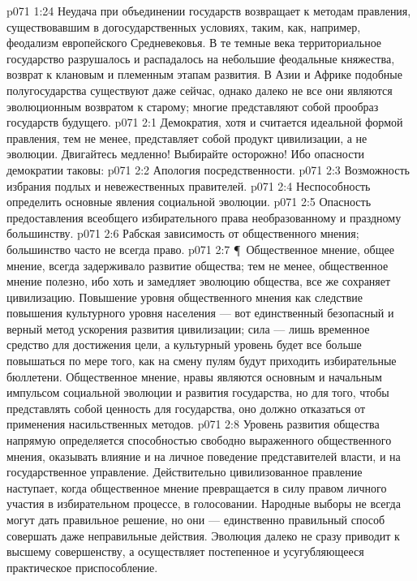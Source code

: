 \vs p071 1:24 Неудача при объединении государств возвращает к методам правления, существовавшим в догосударственных условиях, таким, как, например, феодализм европейского Средневековья. В те темные века территориальное государство разрушалось и распадалось на небольшие феодальные княжества, возврат к клановым и племенным этапам развития. В Азии и Африке подобные полугосударства существуют даже сейчас, однако далеко не все они являются эволюционным возвратом к старому; многие представляют собой прообраз государств будущего.
\vs p071 2:1 Демократия, хотя и считается идеальной формой правления, тем не менее, представляет собой продукт цивилизации, а не эволюции. Двигайтесь медленно! Выбирайте осторожно! Ибо опасности демократии таковы:
\vs p071 2:2 \bibnobreakspace Апология посредственности.
\vs p071 2:3 \bibnobreakspace Возможность избрания подлых и невежественных правителей.
\vs p071 2:4 \bibnobreakspace Неспособность определить основные явления социальной эволюции.
\vs p071 2:5 \bibnobreakspace Опасность предоставления всеобщего избирательного права необразованному и праздному большинству.
\vs p071 2:6 \bibnobreakspace Рабская зависимость от общественного мнения; большинство часто не всегда право.
\vs p071 2:7 \P\ Общественное мнение, общее мнение, всегда задерживало развитие общества; тем не менее, общественное мнение полезно, ибо хоть и замедляет эволюцию общества, все же сохраняет цивилизацию. Повышение уровня общественного мнения как следствие повышения культурного уровня населения --- вот единственный безопасный и верный метод ускорения развития цивилизации; сила --- лишь временное средство для достижения цели, а культурный уровень будет все больше повышаться по мере того, как на смену пулям будут приходить избирательные бюллетени. Общественное мнение, нравы являются основным и начальным импульсом социальной эволюции и развития государства, но для того, чтобы представлять собой ценность для государства, оно должно отказаться от применения насильственных методов.
\vs p071 2:8 Уровень развития общества напрямую определяется способностью свободно выраженного общественного мнения, оказывать влияние и на личное поведение представителей власти, и на государственное управление. Действительно цивилизованное правление наступает, когда общественное мнение превращается в силу правом личного участия в избирательном процессе, в голосовании. Народные выборы не всегда могут дать правильное решение, но они --- единственно правильный способ совершать даже неправильные действия. Эволюция далеко не сразу приводит к высшему совершенству, а осуществляет постепенное и усугубляющееся практическое приспособление.
